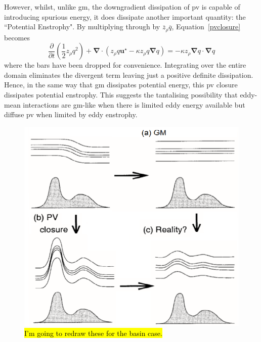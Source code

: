 \documentclass[12pt,a4paper]{report}
\newcommand*\mean[1]{\overline{#1}}
\newcommand*\equref[1]{Equation~\eqref{#1}}
\newcommand*{\half}{\frac{1}{2}}
\begin{document}
                However, whilst, unlike \gls{gm}, the downgradient
                dissipation of \gls{pv} is capable of introducing spurious energy, it does
                dissipate another important quantity: 
                the ``Potential Enstrophy". By multiplying through 
                by $\mean{z}_{\rho} \mean{q}$, \equref{pvclosure} becomes 
                \begin{equation}
                \frac{\partial  }{\partial t}\left(\half z_{\rho}q^{2}\right) + \boldsymbol{\nabla}\cdot\left(z_{\rho}q\boldsymbol{u}^\star-\kappa z_{\rho}q\boldsymbol{\nabla} q
                \right)=-\kappa z_\rho \boldsymbol{\nabla}q\cdot\boldsymbol{\nabla}q
                \end{equation}
                where the bars have been dropped for convenience.
                Integrating over the entire domain eliminates the divergent term
                leaving just a positive definite dissipation.
                Hence, in the same way that \gls{gm} dissipates potential energy, this
                \gls{pv} closure dissipates potential enstrophy. This suggests the tantalising
                possibility that eddy-mean interactions are \gls{gm}-like when
                there is limited eddy energy available but diffuse \gls{pv} when
                limited by eddy enstrophy.
                
                \begin{figure}
                	\centering
                	\includegraphics[width=0.6\linewidth]{am00}
                	\caption[Cold-doming]{\hl{I'm going to redraw these for the basin case.}}
                	\label{fig:Colddoming}
                \end{figure}
                
                
                
\end{document}
